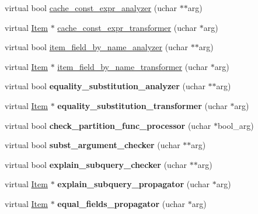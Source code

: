 \begin{DoxyCompactItemize}
virtual bool \mbox{\hyperlink{classItem_a1957a7092839e6913cc8c6ed901c7bea}{cache\+\_\+const\+\_\+expr\+\_\+analyzer}} (uchar $\ast$$\ast$arg)
\item 
virtual \mbox{\hyperlink{classItem}{Item}} $\ast$ \mbox{\hyperlink{classItem_a4ce0aa0716b2a6b5b29c6c455d0d76db}{cache\+\_\+const\+\_\+expr\+\_\+transformer}} (uchar $\ast$arg)
\item 
virtual bool \mbox{\hyperlink{classItem_a7d19cd31c89cf5e660667dc27873a265}{item\+\_\+field\+\_\+by\+\_\+name\+\_\+analyzer}} (uchar $\ast$$\ast$arg)
\item 
virtual \mbox{\hyperlink{classItem}{Item}} $\ast$ \mbox{\hyperlink{classItem_ae697702435e782119336e6fc3fb6d204}{item\+\_\+field\+\_\+by\+\_\+name\+\_\+transformer}} (uchar $\ast$arg)
\item 
\mbox{\label{classItem_ac517ef495505fcb649b5ee337db2421f}} 
virtual bool {\bfseries equality\+\_\+substitution\+\_\+analyzer} (uchar $\ast$$\ast$arg)
\item 
\mbox{\label{classItem_afa6e1c3ddf41cad0f77a3d1cc010fe88}} 
virtual \mbox{\hyperlink{classItem}{Item}} $\ast$ {\bfseries equality\+\_\+substitution\+\_\+transformer} (uchar $\ast$arg)
\item 
\mbox{\label{classItem_a05a7f6ddd521a7215e90e42542fd8ba4}} 
virtual bool {\bfseries check\+\_\+partition\+\_\+func\+\_\+processor} (uchar $\ast$bool\+\_\+arg)
\item 
\mbox{\label{classItem_a0ae01cdd5731103daecd4b04dbd36840}} 
virtual bool {\bfseries subst\+\_\+argument\+\_\+checker} (uchar $\ast$$\ast$arg)
\item 
\mbox{\label{classItem_aa758aa1db3baf38843990bb8428cbcae}} 
virtual bool {\bfseries explain\+\_\+subquery\+\_\+checker} (uchar $\ast$$\ast$arg)
\item 
\mbox{\label{classItem_a682f321153ac1050b7b245b5012a494f}} 
virtual \mbox{\hyperlink{classItem}{Item}} $\ast$ {\bfseries explain\+\_\+subquery\+\_\+propagator} (uchar $\ast$arg)
\item 
\mbox{\label{classItem_a31332cb08fd6b858c2d9e70f8141e304}} 
virtual \mbox{\hyperlink{classItem}{Item}} $\ast$ {\bfseries equal\+\_\+fields\+\_\+propagator} (uchar $\ast$arg)
$$
\end{DoxyCompactItemize}
